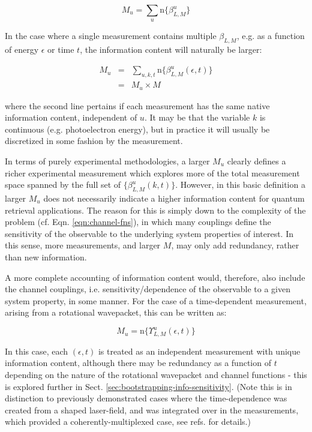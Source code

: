 \documentclass[10pt]{article}
\begin{document}
\begin{equation}
M_{u}=\sum_{u}\mathrm{n}\{\beta_{L,M}^{u}\}
\end{equation}

In the case where a single measurement contains multiple $\beta_{L,M}$, e.g. as a function of energy $\epsilon$ or time $t$, the information content will naturally be larger:

\begin{eqnarray}
M_{u} & = & \sum_{u,k,t}\mathrm{n}\{\beta_{L,M}^{u}(\epsilon,t)\}\\
 & = & M_{u}\times M
\end{eqnarray}

where the second line pertains if each measurement has the same native
information content, independent of $u$. It may be that the variable
$k$ is continuous (e.g. photoelectron energy), but in practice it
will usually be discretized in some fashion by the measurement.

In terms of purely experimental methodologies, a larger $M_{u}$ clearly defines a richer experimental measurement which explores more of the total measurement space spanned by the full set of $\{\beta_{L,M}^{u}(k,t)\}$. However, in this basic definition a larger $M_{u}$ does not necessarily indicate a higher information content for quantum retrieval applications.
The reason for this is simply down to the complexity of the problem
(cf. Eqn. \ref{eqn:channel-fns}), in which many couplings define
the sensitivity of the observable to the underlying system properties
of interest. In this sense, more measurements, and larger $M$, may
only add redundancy, rather than new information.

A more complete accounting of information content would, therefore,
also include the channel couplings, i.e. sensitivity/dependence of the observable to a given system property, in some manner. For the case of a time-dependent measurement, arising from a rotational wavepacket, this can be written as:

\begin{equation}
M_{u}=\mathrm{n}\{\varUpsilon_{L,M}^{u}(\epsilon,t)\}
\end{equation}

In this case, each $(\epsilon,t)$ is treated as an independent measurement with unique information content, although there may be redundancy as a function of $t$ depending on the nature of the rotational wavepacket and channel functions - this is explored further in Sect. \ref{sec:bootstrapping-info-sensitivity}. (Note this is in distinction to previously demonstrated cases where the time-dependence was created from a shaped laser-field, and was integrated over in the measurements, which provided a coherently-multiplexed case, see refs. \cite{hockett2014CompletePhotoionizationExperiments, hockett2015CompletePhotoionizationExperiments,hockett2015CoherentControlPhotoelectron} for details.)
\end{document}
